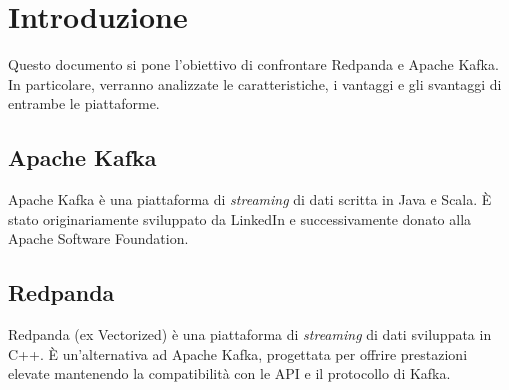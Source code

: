 \section{Introduzione}
Questo documento si pone l'obiettivo di confrontare Redpanda e Apache Kafka.
In particolare, verranno analizzate le caratteristiche, i vantaggi e gli svantaggi di entrambe le piattaforme.\\

\subsection{Apache Kafka}
Apache Kafka è una piattaforma di \textit{streaming} di dati scritta in Java e Scala.
È stato originariamente sviluppato da LinkedIn e successivamente donato alla Apache Software Foundation.

\subsection{Redpanda}
Redpanda (ex Vectorized) è una piattaforma di \textit{streaming} di dati sviluppata in C++.
È un'alternativa ad Apache Kafka, progettata per offrire prestazioni elevate
mantenendo la compatibilità con le API e il protocollo di Kafka.
